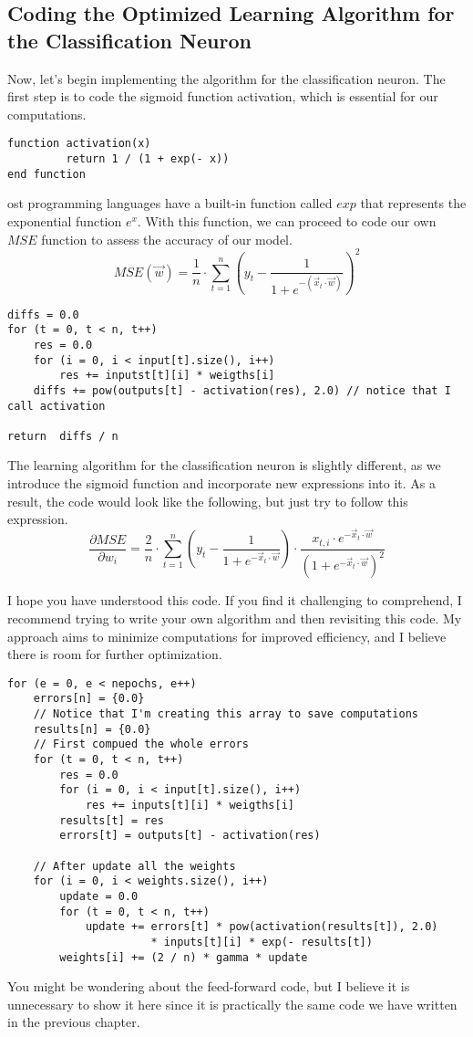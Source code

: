 \subsection{Coding the Optimized Learning Algorithm for the Classification Neuron}
Now, let's begin implementing the algorithm for the classification neuron. The first step is to code
the sigmoid function activation, which is essential for our computations.
\begin{verbatim}
function activation(x)
         return 1 / (1 + exp(- x))
end function
\end{verbatim}
ost programming languages have a built-in function called $exp$ that represents the exponential function $e^x$.
With this function, we can proceed to code our own $MSE$ function to assess the accuracy of our model.
\[
MSE(\vec{w}) = \frac{1}{n} \cdot \sum_{t = 1}^{n}(y_t - \frac{1}{1 + e^{-(\vec{x}_t \cdot \vec{w})}})^2
\]
\begin{verbatim}
diffs = 0.0
for (t = 0, t < n, t++)
    res = 0.0
    for (i = 0, i < input[t].size(), i++)
        res += inputst[t][i] * weigths[i]
    diffs += pow(outputs[t] - activation(res), 2.0) // notice that I call activation

return  diffs / n
\end{verbatim}
The learning algorithm for the classification neuron is slightly different, as we introduce the sigmoid
function and incorporate new expressions into it. As a result, the code would look like the following,
but just try to follow this expression.
\[
\frac{\partial MSE}{\partial w_i} = \frac{2}{n} \cdot \sum_{t = 1}^n
(y_t - \frac{1}{1 + e^{-\vec{x}_t \cdot \vec{w}}}) \cdot
\frac{x_{t, i} \cdot e^{- \vec{x}_t \cdot \vec{w}}}{(1 + e^{- \vec{x}_t \cdot \vec{w}})^2}
\]

I hope you have understood this code. If you find it challenging to comprehend, I recommend trying to write
your own algorithm and then revisiting this code. My approach aims to minimize computations for improved
efficiency, and I believe there is room for further optimization.
\begin{verbatim}
for (e = 0, e < nepochs, e++)
    errors[n] = {0.0}
    // Notice that I'm creating this array to save computations
    results[n] = {0.0}
    // First compued the whole errors
    for (t = 0, t < n, t++)
        res = 0.0
        for (i = 0, i < input[t].size(), i++)
            res += inputs[t][i] * weigths[i]
        results[t] = res
        errors[t] = outputs[t] - activation(res)

    // After update all the weights
    for (i = 0, i < weights.size(), i++)
        update = 0.0
        for (t = 0, t < n, t++)
            update += errors[t] * pow(activation(results[t]), 2.0)
                      * inputs[t][i] * exp(- results[t])
        weights[i] += (2 / n) * gamma * update
\end{verbatim}
You might be wondering about the feed-forward code, but I believe it is unnecessary to
show it here since it is practically the same code we have written in the previous chapter.
